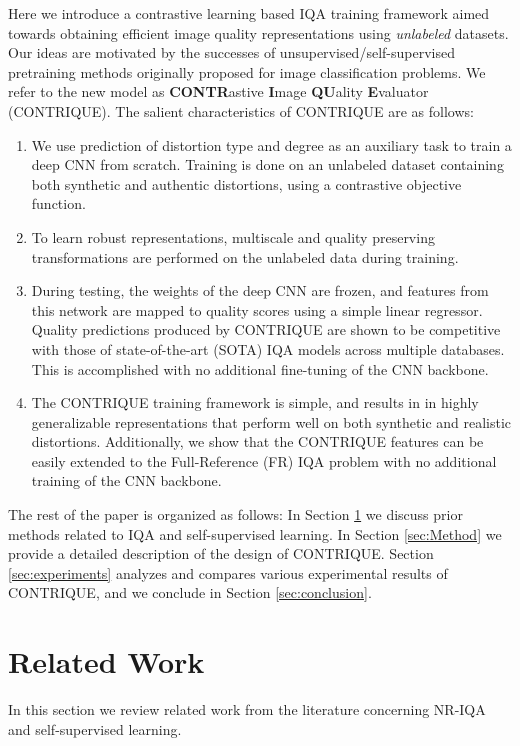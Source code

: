\documentclass[journal]{IEEEtran}
\begin{document}
Here we introduce a contrastive learning based IQA training framework aimed towards obtaining efficient image quality representations using \textit{unlabeled} datasets. Our ideas are motivated by the successes of unsupervised/self-supervised pretraining methods \cite{dosovitskiy2014discriminative,bojanowski2017,chen2020simple,he2020momentum} originally proposed for image classification problems.  We refer to the new model as \textbf{CONTR}astive \textbf{I}mage \textbf{QU}ality \textbf{E}valuator (CONTRIQUE). The salient characteristics of CONTRIQUE are as follows:
\begin{enumerate}
    \item We use prediction of distortion type and degree as an auxiliary task to train a deep CNN from scratch. Training is done on an unlabeled dataset containing both synthetic and authentic distortions, using a contrastive objective function.
    \item To learn robust representations, multiscale and quality preserving transformations are performed on the unlabeled data during training.
    \item During testing, the weights of the deep CNN are frozen, and features from this network are mapped to quality scores using a simple linear regressor. Quality predictions produced by CONTRIQUE are shown to be competitive with those of state-of-the-art (SOTA) IQA models across multiple databases. This is accomplished with no additional fine-tuning of the CNN backbone.
    \item The CONTRIQUE training framework is simple, and results in in highly generalizable representations that perform well on both synthetic and realistic distortions. Additionally, we show that the CONTRIQUE features can be easily extended to the Full-Reference (FR) IQA problem with no additional training of the CNN backbone.
\end{enumerate}

The rest of the paper is organized as follows: In Section \ref{sec:prior_work} we discuss prior methods related to IQA and self-supervised learning. In Section \ref{sec:Method} we provide a detailed description of the design of CONTRIQUE. Section \ref{sec:experiments} analyzes and compares various experimental results of CONTRIQUE, and we conclude in Section \ref{sec:conclusion}.

\section{Related Work}
\label{sec:prior_work}
In this section we review related work from the literature concerning NR-IQA and self-supervised learning.
\end{document}
